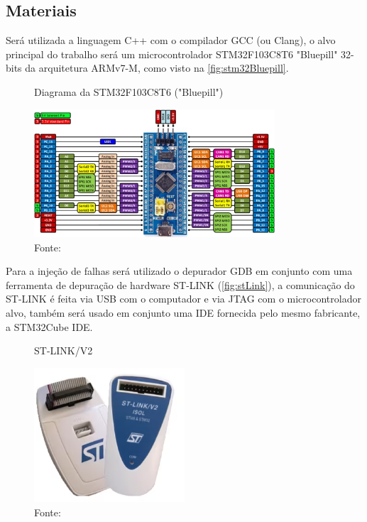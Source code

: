 \subsection{Materiais}

Será utilizada a linguagem C++ com o compilador GCC (ou Clang), o alvo principal do trabalho será um microcontrolador STM32F103C8T6 "Bluepill" 32-bits da arquitetura ARMv7-M, como visto na \autoref{fig:stm32Bluepill}.

\begin{figure}[H]
    \centering
    \captionsetup{justification=centering}
    \caption{Diagrama da STM32F103C8T6 ("Bluepill")}
    \includegraphics[width=0.80\textwidth]{assets/stm32_bluepill.png}
    \captionsetup{justification=raggedright}
    \caption*{Fonte: }
    \label{fig:stm32Bluepill}
\end{figure}

Para a injeção de falhas será utilizado o depurador GDB em conjunto com uma ferramenta de depuração de hardware ST-LINK (\autoref{fig:stLink}), a comunicação do ST-LINK é feita via USB com o computador e via JTAG com o microcontrolador alvo, também será usado em conjunto uma IDE fornecida pelo mesmo fabricante, a STM32Cube IDE.

\begin{figure}[H]
    \centering
    \captionsetup{justification=centering}
    \caption{ST-LINK/V2}
    \includegraphics[width=0.50\textwidth]{assets/st_link.png}
    \captionsetup{justification=raggedright}
    \caption*{Fonte: }
    \label{fig:stLink}
\end{figure}

